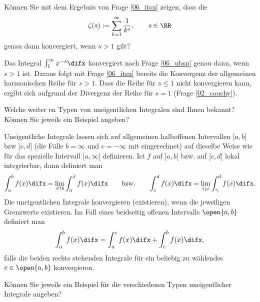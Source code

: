   \begin{frage}
    Können Sie mit dem Ergebnis von Frage \ref{06_itsu} zeigen, 
    dass die  
    \[
    \zeta( s ) := \sum_{k=1}^\infty \frac{1}{k^s}, \qquad s\in \RR
    \]
    genau dann konvergiert, wenn $s>1$ gilt?
  \end{frage}

  \begin{antwort}
    Das Integral $\int_1^\infty x^{-s} \difx$ konvergiert nach Frage 
    \ref{06_ubsp} genau dann, wenn $s>1$ ist. Daraus folgt mit 
    Frage \ref{06_itsu} bereits die Konvergenz der allgemeinen harmonischen 
    Reihe für $s>1$. Dass die Reihe für $s\le 1$ nicht konvergieren kann, 
    ergibt sich aufgrund der Divergenz der Reihe für $s=1$ (Frage \ref{02_cauchy}).
    \AntEnd  
  \end{antwort}

  \begin{frage}\label{06_typu}
    Welche weiter en Typen von uneigentlichen Integralen sind Ihnen bekannt?
    Können Sie jeweils ein Beispiel angeben?
  \end{frage}

  \begin{antwort}
    Uneigentliche Integrale lassen sich 
    auf allgemeinen halboffenen Intervallen  
    $[a,b[$ bzw $]c,d]$ (die Fälle 
    $b=\infty$ und $c=-\infty$ mit eingerechnet) auf dieselbe Weise 
    wie für das spezielle Intervall $[a,\infty[$ definieren.  
    Ist $f$ auf $[a,b[$ bzw. auf $]c,d]$ lokal integrierbar, 
    dann definiert man 
    \[
    \int_a^b f(x)\difx = \lim_{\beta \uparrow b} \int_a^\beta f(x) \difx 
    \qquad\text{bzw.}\qquad
    \int_c^d f(x)\difx = \lim_{\gamma \downarrow c} \int_\gamma^d f(x) \difx.
    \]
    Die uneigentlichen Integrale konvergieren 
    (existieren), wenn die jeweiligen Grenzwerte 
    existieren. 
    Im Fall eines beidseitig offenen Intervalls $\open{a,b}$ definiert man
    \[
    \int_a^b f(x) \difx = \int_a^c f(x)\difx + \int_c^b f(x) \difx,
    \]
    falls die beiden rechts stehenden Integrale für ein 
    beliebig zu wählendes $c\in \open{a,b}$ konvergieren. 
  \end{antwort} 

  \begin{frage}
    Können Sie jeweils ein Beispiel für die verschiedenen 
    Typen uneigentlicher Integrale angeben?
  \end{frage}


